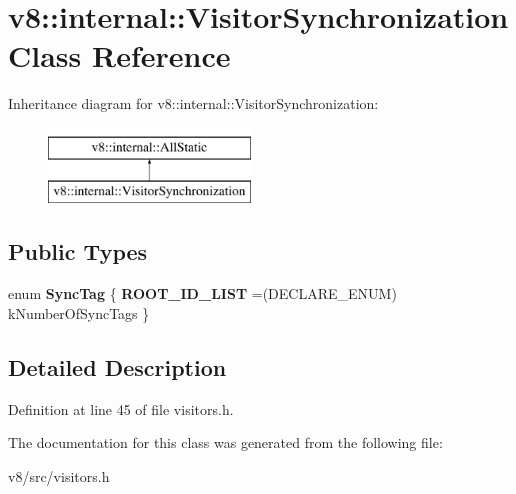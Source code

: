 \hypertarget{classv8_1_1internal_1_1VisitorSynchronization}{}\section{v8\+:\+:internal\+:\+:Visitor\+Synchronization Class Reference}
\label{classv8_1_1internal_1_1VisitorSynchronization}
Inheritance diagram for v8\+:\+:internal\+:\+:Visitor\+Synchronization\+:\begin{figure}[H]
\begin{center}
\leavevmode
\includegraphics[height=2.000000cm]{classv8_1_1internal_1_1VisitorSynchronization}
\end{center}
\end{figure}
\subsection*{Public Types}
\begin{DoxyCompactItemize}
\item 
\mbox{\label{classv8_1_1internal_1_1VisitorSynchronization_a0971ddb5cd5a8da91d074f648187da7a}} 
enum {\bfseries Sync\+Tag} \{ {\bfseries R\+O\+O\+T\+\_\+\+I\+D\+\_\+\+L\+I\+ST} =(D\+E\+C\+L\+A\+R\+E\+\_\+\+E\+N\+UM) k\+Number\+Of\+Sync\+Tags
 \}
\end{DoxyCompactItemize}


\subsection{Detailed Description}


Definition at line 45 of file visitors.\+h.



The documentation for this class was generated from the following file\+:\begin{DoxyCompactItemize}
\item 
v8/src/visitors.\+h\end{DoxyCompactItemize}
